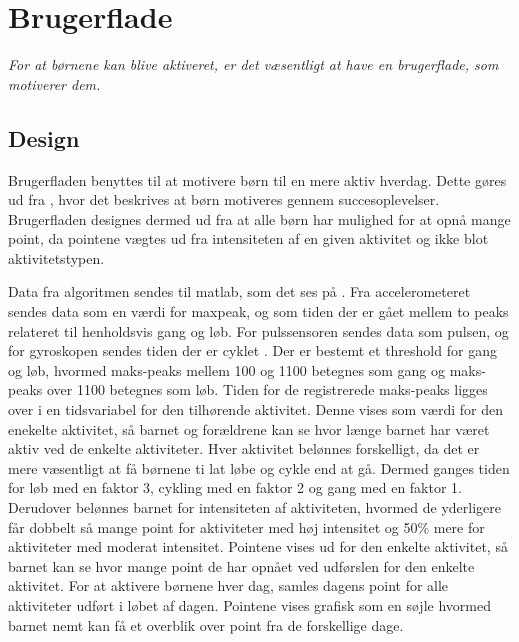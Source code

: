 \section{Brugerflade}
\textit{For at børnene kan blive aktiveret, er det væsentligt at have en brugerflade, som motiverer dem.}
\subsection{Design}
Brugerfladen benyttes til at motivere børn til en mere aktiv hverdag. Dette gøres ud fra , hvor det beskrives at børn motiveres gennem succesoplevelser. Brugerfladen designes dermed ud fra at alle børn har mulighed for at opnå mange point, da pointene vægtes ud fra intensiteten af en given aktivitet og ikke blot aktivitetstypen.

Data fra algoritmen sendes til matlab, som det ses på . Fra accelerometeret sendes data som en værdi for maxpeak, og som tiden der er gået mellem to peaks relateret til henholdsvis gang og løb. For pulssensoren sendes data som pulsen, og for gyroskopen sendes tiden der er cyklet . 
Der er bestemt et threshold for gang og løb, hvormed maks-peaks mellem 100 og 1100 betegnes som gang og maks-peaks over 1100 betegnes som løb. Tiden for de registrerede maks-peaks ligges over i en tidsvariabel for den tilhørende aktivitet. Denne vises som værdi for den enekelte aktivitet, så barnet og forældrene kan se hvor længe barnet har været aktiv ved de enkelte aktiviteter. \newline
Hver aktivitet belønnes forskelligt, da det er mere væsentligt at få børnene ti lat løbe og cykle end at gå. Dermed ganges tiden for løb med en faktor 3, cykling med en faktor 2 og gang med en faktor 1. Derudover belønnes barnet for intensiteten af aktiviteten, hvormed de yderligere får dobbelt så mange point for aktiviteter med høj intensitet og 50\% mere for aktiviteter med moderat intensitet. Pointene vises ud for den enkelte aktivitet, så barnet kan se hvor mange point de har opnået ved udførslen for den enkelte aktivitet.\newline
For at aktivere børnene hver dag, samles dagens point for alle aktiviteter udført i løbet af dagen. Pointene vises grafisk som en søjle hvormed barnet nemt kan få et overblik over point fra de forskellige dage.


